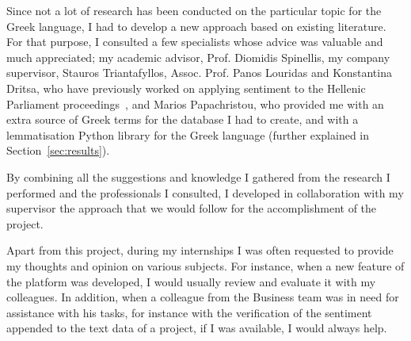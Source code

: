 Since not a lot of research has been conducted
on the particular topic for the Greek language,
I had to develop a new approach based on existing literature.
For that purpose, I consulted a few specialists
whose advice was valuable and much appreciated;
my academic advisor, Prof. Diomidis Spinellis,
my company supervisor, Stauros Triantafyllos,
Assoc. Prof. Panos Louridas and Konstantina Dritsa,
who have previously worked on applying sentiment
to the Hellenic Parliament proceedings~\cite{Dri18},
and Marios Papachristou,
who provided me with an extra source of Greek terms
for the database I had to create,
and with a lemmatisation Python library for the Greek language
(further explained in Section~\ref{sec:results}).

By combining all the suggestions and knowledge I gathered
from the research I performed and the professionals I consulted,
I developed in collaboration with my supervisor
the approach that we would follow
for the accomplishment of the project.

Apart from this project,
during my internships I was often requested
to provide my thoughts and opinion on various subjects.
For instance, when a new feature of the platform was developed,
I would usually review and evaluate it with my colleagues.
In addition, when a colleague from the Business team
was in need for assistance with his tasks,
for instance with the verification of the sentiment appended
to the text data of a project,
if I was available, I would always help.
